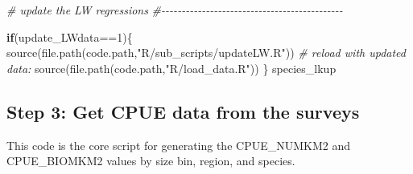 \documentclass[
]{article}
\newenvironment{Shaded}{\begin{snugshade}}{\end{snugshade}}
\newcommand{\CommentTok}[1]{\textcolor[rgb]{0.56,0.35,0.01}{\textit{#1}}}
\newcommand{\ControlFlowTok}[1]{\textcolor[rgb]{0.13,0.29,0.53}{\textbf{#1}}}
\newcommand{\DecValTok}[1]{\textcolor[rgb]{0.00,0.00,0.81}{#1}}
\newcommand{\FunctionTok}[1]{\textcolor[rgb]{0.00,0.00,0.00}{#1}}
\newcommand{\NormalTok}[1]{#1}
\newcommand{\SpecialCharTok}[1]{\textcolor[rgb]{0.00,0.00,0.00}{#1}}
\newcommand{\StringTok}[1]{\textcolor[rgb]{0.31,0.60,0.02}{#1}}
\begin{document}
\begin{Shaded}
\begin{Highlighting}[]
  \CommentTok{\# update the LW regressions }
  \CommentTok{\#{-}{-}{-}{-}{-}{-}{-}{-}{-}{-}{-}{-}{-}{-}{-}{-}{-}{-}{-}{-}{-}{-}{-}{-}{-}{-}{-}{-}{-}{-}{-}{-}{-}{-}{-}{-}{-}{-}{-}{-}{-}{-}{-}{-}{-}  }

  \ControlFlowTok{if}\NormalTok{(update\_LWdata}\SpecialCharTok{==}\DecValTok{1}\NormalTok{)\{     }
     \FunctionTok{source}\NormalTok{(}\FunctionTok{file.path}\NormalTok{(code.path,}\StringTok{"R/sub\_scripts/updateLW.R"}\NormalTok{))}
     \CommentTok{\# reload with updated data:}
     \FunctionTok{source}\NormalTok{(}\FunctionTok{file.path}\NormalTok{(code.path,}\StringTok{"R/load\_data.R"}\NormalTok{))}
\NormalTok{  \}}
\NormalTok{  species\_lkup}
\end{Highlighting}
\end{Shaded}

\hypertarget{step-3-get-cpue-data-from-the-surveys}{%
\subsection{Step 3: Get CPUE data from the
surveys}\label{step-3-get-cpue-data-from-the-surveys}}

This code is the core script for generating the CPUE\_NUMKM2 and
CPUE\_BIOMKM2 values by size bin, region, and species.
\end{document}
